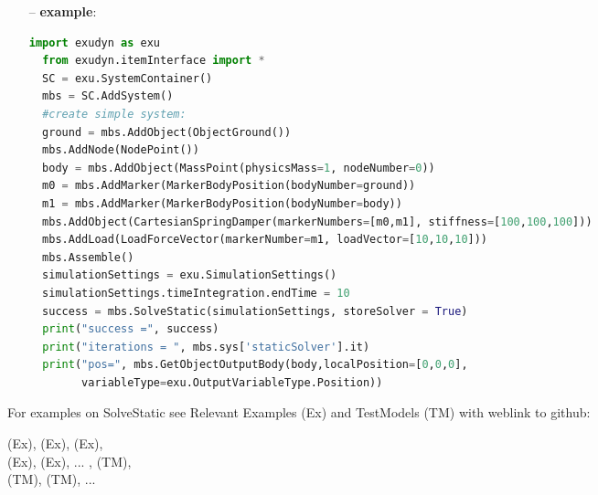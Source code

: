 \begin{itemize}[leftmargin=0.7cm]
\item[--]
{\bf example}: \vspace{-12pt}\ei\begin{lstlisting}[language=Python, xleftmargin=36pt]
  import exudyn as exu
  from exudyn.itemInterface import *
  SC = exu.SystemContainer()
  mbs = SC.AddSystem()
  #create simple system:
  ground = mbs.AddObject(ObjectGround())
  mbs.AddNode(NodePoint())
  body = mbs.AddObject(MassPoint(physicsMass=1, nodeNumber=0))
  m0 = mbs.AddMarker(MarkerBodyPosition(bodyNumber=ground))
  m1 = mbs.AddMarker(MarkerBodyPosition(bodyNumber=body))
  mbs.AddObject(CartesianSpringDamper(markerNumbers=[m0,m1], stiffness=[100,100,100]))
  mbs.AddLoad(LoadForceVector(markerNumber=m1, loadVector=[10,10,10]))
  mbs.Assemble()
  simulationSettings = exu.SimulationSettings()
  simulationSettings.timeIntegration.endTime = 10
  success = mbs.SolveStatic(simulationSettings, storeSolver = True)
  print("success =", success)
  print("iterations = ", mbs.sys['staticSolver'].it)
  print("pos=", mbs.GetObjectOutputBody(body,localPosition=[0,0,0],
        variableType=exu.OutputVariableType.Position))
\end{lstlisting}\vspace{-24pt}\bi\item[]\vspace{-24pt}\vspace{12pt}\end{itemize}
%

%
\noindent For examples on SolveStatic see Relevant Examples (Ex) and TestModels (TM) with weblink to github:
\bi
 \item \footnotesize {} (Ex), 
 (Ex), 
 (Ex), 
\\  (Ex), 
 (Ex), 
 ...
, 
 (TM), 
\\  (TM), 
 (TM), 
 ...

